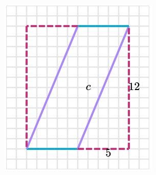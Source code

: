 \begin{solutionbox}{14cm}
\begin{minipage}{0.4\textwidth}
\begin{multicols}{2}
\begin{figure}[H]
                \caption{}
                \label{fig:peri_paralelogramo_03b}
            \end{figure}
        \end{multicols}
        \begin{multicols}{2}
            \begin{figure}[H]
                \centering
                \includegraphics[width=0.9\linewidth]{../images/peri_paralelogramo_03c.png}
                \caption{}
                \label{fig:peri_paralelogramo_03c}
            \end{figure}
            \begin{figure}[H]
                \centering

\end{figure}
\end{multicols}
\end{minipage}
\end{solutionbox}
